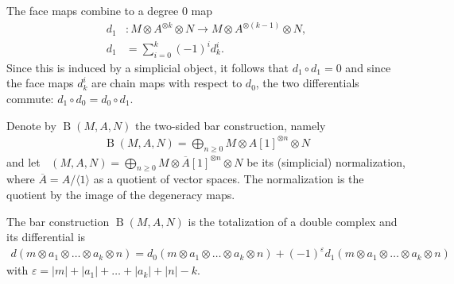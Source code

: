 \documentclass{scrartcl}
\theoremstyle{plain}
\newtheorem{lemma}[theorem]{Lemma}
\theoremstyle{definition}
\renewcommand{\epsilon}{\varepsilon}
\newcommand{\abs}[1]{\left\lvert#1\right\rvert}
\DeclareMathOperator{\BC}{B}
\DeclareMathOperator{\nBC}{\hat B}
\newcommand{\comp}{\mathbin{\circ}}
\begin{document}
The face maps combine to a degree $0$ map
\begin{align*}
    d_1&\colon M\otimes A^{\otimes k}\otimes N\to M\otimes A^{\otimes (k-1)}\otimes N, \\
    d_1& = \sum_{i=0}^k (-1)^i d_k^i.
\end{align*} 
Since this is induced by a simplicial object, it follows that $d_1\comp d_1 = 0$ and since the face maps $d_k^i$ are chain maps with respect to $d_0$, the two differentials commute: $d_1 \comp d_0 = d_0\comp d_1$. 

Denote by $\BC(M, A, N)$ the two-sided bar construction, namely 
\begin{align*}
    \BC(M, A, N) = \bigoplus_{n\geq 0} M\otimes A[1]^{\otimes n} \otimes N
\end{align*}
and let $\nBC(M, A, N) = \bigoplus_{n\geq 0} M\otimes \overline {A}[1]^{\otimes n}\otimes N$ be its (simplicial) normalization, where $\overline A = A/\langle 1\rangle$ as a quotient of vector spaces. The normalization is the quotient by the image of the degeneracy maps. 

The bar construction $\BC(M, A, N)$ is the totalization of a double complex and its differential is 
\begin{align*}
    d(m\otimes a_1\otimes \dots\otimes a_k\otimes n) = d_0(m\otimes a_1\otimes \dots\otimes a_k\otimes n) + (-1)^\epsilon d_1(m\otimes a_1\otimes \dots\otimes a_k\otimes n)
\end{align*}
with $\epsilon = \abs{m}+\abs{a_1}+\dots+\abs{a_{k}} + \abs{n} - k$.

\end{document}
